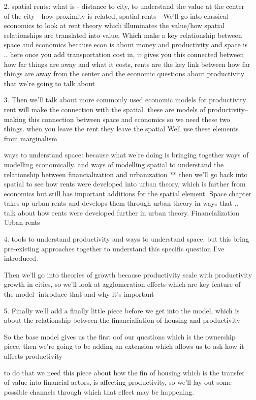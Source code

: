 2. spatial rents: what is - distance to city, to understand the value at the center of the city - how proximity is related, spatial rents - We'll go into classical economics to look at rent theory which illuminates the value/how spatial relationships are translated into value. Which make a key relationship between space and economics because econ is about money and productivity and space is .. here once you add transportation cost in, it gives you this connected between how far things are away and what it costs, rents are the key link between how far things are away from the center and the economic questions about productivity  that we're going to talk about

3. Then we'll talk about more commonly used economic models for productivity
rent will make the connection with the spatial. 
these are models of productivity-- making this connection between space and economics so we need these two things.
when you leave the rent they leave the spatial
Well use these elements from marginalism

 ways to understand space: because what we’re doing is bringing together ways of modelling economically. and ways of modelling spatial to understand the relationship between financialization and urbanization **
then we'll go back into spatial to see how rents were developed into urban theory, which is farther from economics but still has important additions for the spatial element. 
Space chapter takes up urban rents and develops them through urban theory in ways that .. talk about how rents were developed further in urban theory.
Financialization
Urban rents

4. tools to understand productivity and ways to understand space. but this bring pre-existing approaches together to understand this specific question I've introduced.


Then we'll go into theories of growth because productivity scale with productivity growth in cities, so we'll look at agglomeration effects which are key feature of the model- introduce that and why it's important

5. Finally  we'll add a finally little piece before we get  into the model,  which is about the relationship between the financialiation of housing and productivity

So the base model gives us the first oof our questions which is the ownership piece, then we're going to be adding an extension which allows us to ask how it affects productivity

to do that we need this piece about how the fin of housing which is the transfer of value into financial actors, is affecting productivity, so we'll lay out some possible channels through which that effect may be happening.

